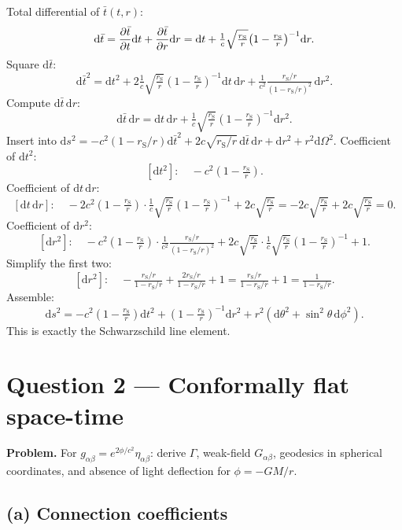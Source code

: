 \documentclass[11pt]{article}
\newcommand{\de}{\mathrm{d}}
\newcommand{\rs}{r_{\mathrm{S}}}
\begin{document}
Total differential of $\bar t(t,r)$:
\[
\de\bar t = \pdv{\bar t}{t}\de t + \pdv{\bar t}{r}\de r = \de t + \tfrac{1}{c}\sqrt{\tfrac{\rs}{r}}\!\left(1-\tfrac{\rs}{r}\right)^{-1}\!\de r.
\]
Square $\de\bar t$:
\[
\de\bar t^2 = \de t^2 + 2\tfrac{1}{c}\sqrt{\tfrac{\rs}{r}}\!\left(1-\tfrac{\rs}{r}\right)^{-1}\!\de t\,\de r + \tfrac{1}{c^2}\tfrac{\rs/r}{(1-\rs/r)^2}\,\de r^2.
\]
Compute $\de\bar t\,\de r$:
\[
\de\bar t\,\de r = \de t\,\de r + \tfrac{1}{c}\sqrt{\tfrac{\rs}{r}}\!\left(1-\tfrac{\rs}{r}\right)^{-1}\!\de r^2.
\]
Insert into $\de s^2 = -c^2(1-\rs/r)\de\bar t^2 + 2c\sqrt{\rs/r}\,\de\bar t\,\de r + \de r^2 + r^2\de\Omega^2$. Coefficient of $\de t^2$:
\[
[\de t^2]:\quad -c^2\!\left(1-\tfrac{\rs}{r}\right).
\]
Coefficient of $\de t\,\de r$:
\[
[\de t\,\de r]:\quad -2c^2\!\left(1-\tfrac{\rs}{r}\right)\!\cdot\tfrac{1}{c}\sqrt{\tfrac{\rs}{r}}\!\left(1-\tfrac{\rs}{r}\right)^{-1} + 2c\sqrt{\tfrac{\rs}{r}} = -2c\sqrt{\tfrac{\rs}{r}} + 2c\sqrt{\tfrac{\rs}{r}} = 0.
\]
Coefficient of $\de r^2$:
\[
[\de r^2]:\quad -c^2\!\left(1-\tfrac{\rs}{r}\right)\!\cdot\tfrac{1}{c^2}\tfrac{\rs/r}{(1-\rs/r)^2} + 2c\sqrt{\tfrac{\rs}{r}}\!\cdot\tfrac{1}{c}\sqrt{\tfrac{\rs}{r}}\!\left(1-\tfrac{\rs}{r}\right)^{-1} + 1.
\]
Simplify the first two:
\[
[\de r^2]:\quad -\tfrac{\rs/r}{1-\rs/r} + \tfrac{2\rs/r}{1-\rs/r} + 1 = \tfrac{\rs/r}{1-\rs/r} + 1 = \tfrac{1}{1-\rs/r}.
\]
Assemble:
\begin{equation}
\boxed{\;\de s^2 = -c^2\!\left(1-\tfrac{\rs}{r}\right)\!\de t^2 + \!\left(1-\tfrac{\rs}{r}\right)^{-1}\!\de r^2 + r^2(\de\theta^2+\sin^2\theta\,\de\phi^2).\;}
\label{eq:schw}
\end{equation}
This is exactly the Schwarzschild line element.

\section*{Question 2 --- Conformally flat space-time}

\textbf{Problem.} For $g_{\alpha\beta}=e^{2\phi/c^2}\eta_{\alpha\beta}$: derive $\Gamma$, weak-field $G_{\alpha\beta}$, geodesics in spherical coordinates, and absence of light deflection for $\phi=-GM/r$.

\subsection*{(a) Connection coefficients}
\end{document}
